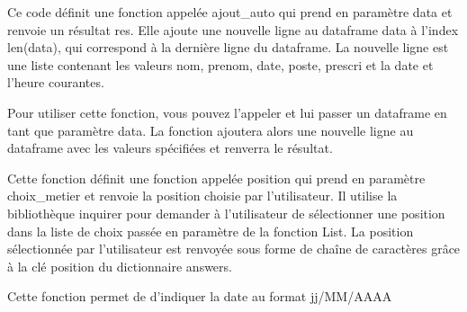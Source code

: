 \documentclass[letterpaper,10pt,french]{sphinxmanual}
\begin{document}
\begin{fulllineitems}
\label{\detokenize{Definition_des_fonctions:boucle_automatisation.ajout_auto}}
\pysigstartsignatures
{}
\pysigstopsignatures
\sphinxAtStartPar
Ce code définit une fonction appelée ajout\_auto qui prend en paramètre data et renvoie un résultat res. Elle ajoute
une nouvelle ligne au dataframe data à l’index len(data), qui correspond à la dernière ligne du dataframe. La nouvelle
ligne est une liste contenant les valeurs nom, prenom, date, poste, prescri et la date et l’heure courantes.

\sphinxAtStartPar
Pour utiliser cette fonction, vous pouvez l’appeler et lui passer un dataframe en tant que paramètre data. La fonction 
ajoutera alors une nouvelle ligne au dataframe avec les valeurs spécifiées et renverra le résultat.

\end{fulllineitems}


\begin{fulllineitems}
\label{\detokenize{Definition_des_fonctions:boucle_automatisation.position}}
\pysigstartsignatures
{}
\pysigstopsignatures
\sphinxAtStartPar
Cette fonction définit une fonction appelée position qui prend en paramètre choix\_metier et renvoie la position choisie 
par l’utilisateur. Il utilise la bibliothèque inquirer pour demander à l’utilisateur de sélectionner une position dans 
la liste de choix passée en paramètre de la fonction List. La position sélectionnée par l’utilisateur est renvoyée 
sous forme de chaîne de caractères grâce à la clé position du dictionnaire answers.

\end{fulllineitems}


\begin{fulllineitems}
\label{\detokenize{Definition_des_fonctions:boucle_automatisation.time}}
\pysigstartsignatures
{}
\pysigstopsignatures
\sphinxAtStartPar
Cette fonction permet de d’indiquer la date au format jj/MM/AAAA

\end{fulllineitems}
\end{document}
